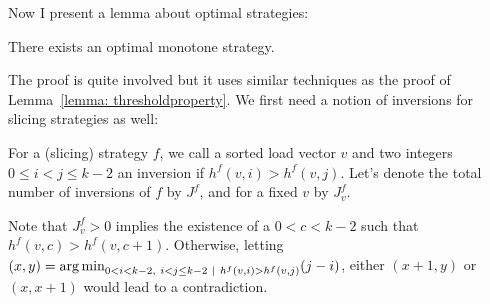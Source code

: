 Now I present a lemma about optimal strategies:

\begin{lemma} \label{lemma: k-thinning-monotone}
There exists an optimal monotone strategy.
\end{lemma}



The proof is quite involved but it uses similar techniques as the proof of Lemma~\ref{lemma: thresholdproperty}. We first need a notion of inversions for \KThinning slicing strategies as well:


\begin{definition} 
For a (slicing) strategy $f$, we call a sorted load vector $v$ and two integers $0\leq i<j\leq k-2$ an inversion if $h^f(v,i)>h^f(v,j)$. Let's denote the total number of inversions of $f$ by $J^f$, and for a fixed $v$ by $J^f_v$.
\end{definition}


\begin{remark}
Note that $J^f_v>0$ implies the existence of a $0<c<k-2$ such that $h^f(v,c)>h^f(v,c+1)$. Otherwise, letting $(x,y)=\argmin_{0<i<k-2,\ i<j\leq k-2\ \mid\ h^f(v,i)>h^f(v,j)} (j-i)$, either $(x+1,y)$ or $(x,x+1)$ would lead to a contradiction.
\end{remark}


